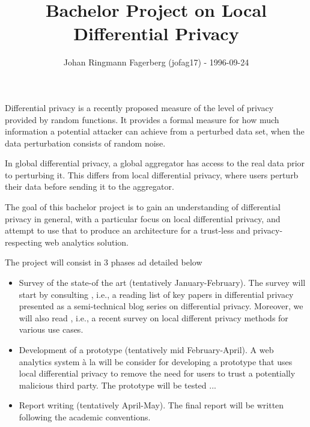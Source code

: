 \documentclass[a4paper]{article}
\title{\vspace{-2cm}Bachelor Project on Local Differential Privacy}
\author{Johan Ringmann Fagerberg (jofag17) - 1996-09-24}
\date{}
\begin{document}
\maketitle

\begin{description}[style=nextline]
    \item[Motivation] Differential privacy is a recently proposed measure of the level of privacy provided by random functions. It provides a formal measure for how much information a potential attacker can achieve from a perturbed data set, when the data perturbation consists of random noise.
    
    In global differential privacy, a global aggregator has access to the real data prior to perturbing it. This differs from local differential privacy, where users perturb their data before sending it to the aggregator.
    
    The goal of this bachelor project is to gain an understanding of 
differential privacy in general, with a particular focus on local differential 
privacy, and attempt to use that to produce an architecture for a trust-less 
and privacy-respecting web analytics solution.

\item[Plan]
    The project will consist in 3 phases ad detailed below
    \begin{itemize}
     \item Survey of the state-of the art (tentatively January-February). 
The survey will start by consulting \cite{desfontain_overview}, i.e., a reading 
list of key papers in differential privacy presented as a semi-technical blog 
series on differential privacy. Moreover, we will also read 
\cite{localdiffpriv_survey}, i.e., a recent survey on local different privacy 
methods for various use cases.
\item
Development of a prototype (tentatively mid February-April). A web analytics 
system à la \cite{webanalytics_2012} will be consider for developing a 
prototype that uses local differential privacy
to remove the need for users to trust a potentially malicious 
third party. The prototype will be tested ...
\item
Report writing (tentatively April-May). The final report will be written 
following the academic conventions.
    \end{itemize}
    

\end{description}
\end{document}
